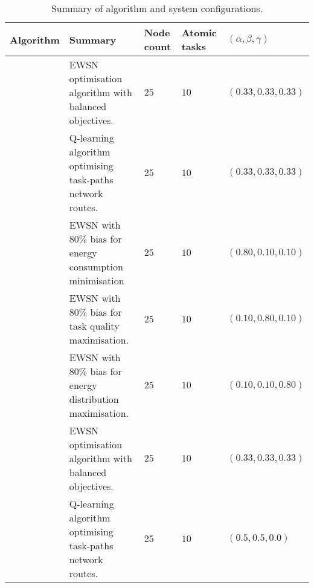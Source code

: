 
\begin{table}[h]
	\begin{tabular}
		{|p{}|p{}|p{}|p{}|p{}|}
		\hline
		\textbf{Algorithm} & \textbf{Summary} & \textbf{Node count} & \textbf{Atomic tasks}  & \textbf{$(\alpha,\beta,\gamma)$}\\
		\hline
		\algorithmBalancedSimple{}{} &  EWSN optimisation algorithm with balanced objectives. & $25$ & $10$    & $(0.33,0.33,0.33)$  \\
		\algorithmQRoutingSimple{}{} &  Q-learning algorithm optimising task-paths network routes. & $25$ & $10$    & $(0.33,0.33,0.33)$  \\
		\algorithmEnergy{}{} & EWSN with $80\%$ bias for energy consumption minimisation  & $25$ & $10$   & $(0.80,0.10,0.10)$  \\
		\algorithmQuality{}{} & EWSN with $80\%$ bias for task quality maximisation. & $25$ & $10$   & $(0.10,0.80,0.10)$  \\
		\algorithmDistribution{}{} & EWSN with $80\%$ bias for energy distribution maximisation. & $25$ & $10$  & $(0.10,0.10,0.80)$  \\
		\algorithmFailure{}{} &  EWSN optimisation algorithm with balanced objectives. & $25$ & $10$   & $(0.33,0.33,0.33)$  \\
		\algorithmQRoutingFailure{}{} &  Q-learning algorithm optimising task-paths network routes.  & $25$ & $10$ & $(0.5,0.5,0.0)$  \\
		
		\hline
	\end{tabular}
	\captionsetup{labelfont=bf,singlelinecheck=on}
	\caption{Summary of algorithm and system configurations.}
	\label{table:summary_of_configurations}
\end{table}


